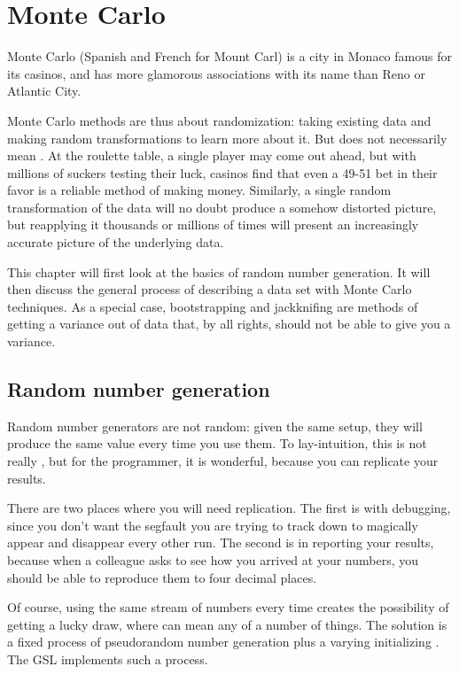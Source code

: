 \chapter{Monte Carlo} \label{boot} 

Monte Carlo (Spanish and French for Mount Carl) is a city in Monaco
famous for its casinos, and has more glamorous associations with its name
than Reno or Atlantic City.

Monte Carlo methods are thus about randomization: taking existing data
and making random transformations to learn more about it. But
 does not necessarily mean .
At the
roulette table, a single player may come out ahead, but with millions of
suckers testing their luck, casinos find that even a 49-51 bet in their
favor is a reliable method of
making money.  Similarly, a single random transformation of the data will
no doubt produce a somehow distorted picture, but reapplying it thousands
or millions of times will present an increasingly accurate picture of
the underlying data.

This chapter will first look at the basics of random number generation.
It will then discuss the general process of describing a data set with
Monte Carlo techniques.  As a special case,
bootstrapping and jackknifing are methods of getting a variance out of
data that, by all rights, should not be able to give you a variance. 

\section{Random number generation}\label{randomnumbers}\label{rngs}
Random number generators are not random: given the same setup, they
will produce the same value every time you use them. To lay-intuition,
this is not really , but for the programmer, it is wonderful,
because you can replicate your results.

There are two places where you will need replication. The first is with
debugging, since you don't want the segfault you are trying to track
down to magically appear and disappear every other run. The second is
in reporting your results, because when a colleague asks to see how you
arrived at your numbers, you should be able to reproduce them to four
decimal places.

Of course, using the same stream of numbers every time creates the
possibility of getting a lucky draw, where  can mean any of a
number of things. The solution is a fixed process of pseudorandom
number generation plus a varying initializing . The GSL implements
such a process.


